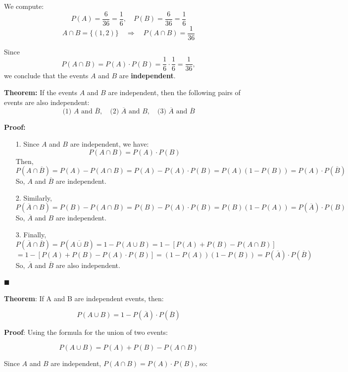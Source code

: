 \documentclass[twoside]{book}
\begin{document}
We compute:
\[
P(A) = \frac{6}{36} = \frac{1}{6}, \quad P(B) = \frac{6}{36} = \frac{1}{6}
\]
\[
A \cap B = \{(1,2)\} \quad \Rightarrow \quad P(A \cap B) = \frac{1}{36}
\]

Since
\[
P(A \cap B) = P(A) \cdot P(B) = \frac{1}{6} \cdot \frac{1}{6} = \frac{1}{36},
\]
we conclude that the events \( A \) and \( B \) are \textbf{independent}.

\begin{textbox}
\textbf{Theorem:}
If the events \( A \) and \( B \) are independent, then the following pairs of events are also independent:
\[
\text{(1) } A \text{ and } \overline{B}, \quad \text{(2) } \overline{A} \text{ and } B, \quad \text{(3) } \overline{A} \text{ and } \overline{B}
\]
\end{textbox}
\textbf{Proof:}

\begin{itemize}
  \item[1.] Since \( A \) and \( B \) are independent, we have:
  \[
  P(A \cap B) = P(A)\cdot P(B)
  \]
  Then,
  \[
  P(A \cap \overline{B}) = P(A) - P(A \cap B) = P(A) - P(A)\cdot P(B) = P(A)(1 - P(B)) = P(A)\cdot P(\overline{B})
  \]
  So, \( A \) and \( \overline{B} \) are independent.

  \item[2.] Similarly,
  \[
  P(\overline{A} \cap B)  = P(B) - P(A \cap B) = P(B) - P(A)\cdot P(B) = P(B)(1 - P(A)) = P(\overline{A})\cdot P(B)
  \]
  So, \( \overline{A} \) and \( B \) are independent.

  \item[3.] Finally,
  \[
  P(\overline{A} \cap \overline{B}) = P(\overline{A \cup B}) = 1 - P(A \cup B) = 1 - [P(A) + P(B) - P(A \cap B)]
  \]
  \[
  = 1 - [P(A) + P(B) - P(A)\cdot P(B)] = (1 - P(A))(1 - P(B)) = P(\overline{A})\cdot P(\overline{B})
  \]
  So, \( \overline{A} \) and \( \overline{B} \) are also independent.
\end{itemize}
\hfill\(\blacksquare\)

\begin{textbox}
    \textbf{Theorem}: If A and B are independent events, then:

\[
P(A \cup B) = 1 - P(\overline{A})\cdot P(\overline{B})
\]
\end{textbox}

\textbf{Proof}: Using the formula for the union of two events:

\[
P(A \cup B) = P(A) + P(B) - P(A \cap B)
\]

Since \( A \) and \( B \) are independent, \( P(A \cap B) = P(A)\cdot P(B) \), so:
\end{document}
